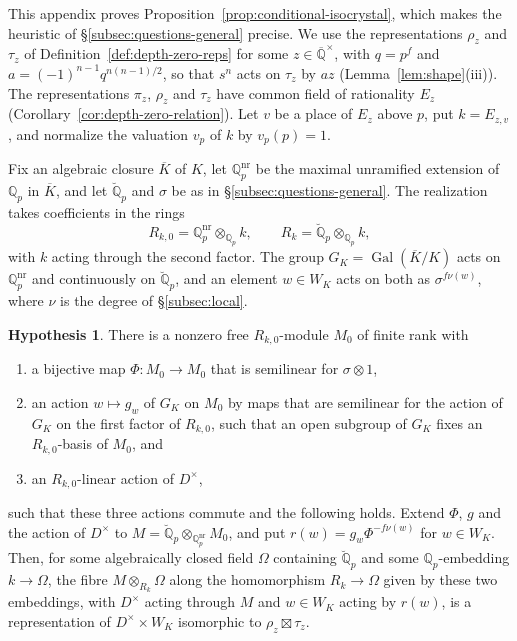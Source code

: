 \documentclass[a4paper,11pt]{amsart}
\theoremstyle{definition}
\newtheorem{hypothesis}[theorem]{Hypothesis}
\theoremstyle{remark}
\numberwithin{equation}{section}
\newcommand{\Q}{\mathbb{Q}}
\DeclareMathOperator{\Gal}{Gal}
\newcommand{\Qb}{\breve{\mathbb{Q}}_p}
\newcommand{\Qbar}{\overline{\mathbb{Q}}}
\begin{document}
This appendix proves Proposition~\ref{prop:conditional-isocrystal}, which makes the heuristic of \S\ref{subsec:questions-general} precise. We use the representations $\rho_z$ and $\tau_z$ of Definition~\ref{def:depth-zero-reps} for some $z\in\Qbar^\times$, with $q=p^f$ and $a=(-1)^{n-1}q^{n(n-1)/2}$, so that $s^n$ acts on $\tau_z$ by $az$ (Lemma~\ref{lem:shape}(iii)). The representations $\pi_z$, $\rho_z$ and $\tau_z$ have common field of rationality $E_z$ (Corollary~\ref{cor:depth-zero-relation}). Let $v$ be a place of $E_z$ above $p$, put $k=E_{z,v}$, and normalize the valuation $v_p$ of $k$ by $v_p(p)=1$.

Fix an algebraic closure $\overline K$ of $K$, let $\Q_p^{\mathrm{nr}}$ be the maximal unramified extension of $\Q_p$ in $\overline K$, and let $\Qb$ and $\sigma$ be as in \S\ref{subsec:questions-general}. The realization takes coefficients in the rings
\[
 R_{k,0}=\Q_p^{\mathrm{nr}}\otimes_{\Q_p}k,\qquad R_k=\Qb\otimes_{\Q_p}k,
\]
with $k$ acting through the second factor. The group $G_K=\Gal(\overline K/K)$ acts on $\Q_p^{\mathrm{nr}}$ and continuously on $\Qb$, and an element $w\in W_K$ acts on both as $\sigma^{f\nu(w)}$, where $\nu$ is the degree of \S\ref{subsec:local}.

\begin{hypothesis}\label{hyp:isocrystal}
There is a nonzero free $R_{k,0}$-module $M_0$ of finite rank with
\begin{enumerate}
\item[(a)] a bijective map $\Phi\colon M_0\to M_0$ that is semilinear for $\sigma\otimes1$,
\item[(b)] an action $w\mapsto g_w$ of $G_K$ on $M_0$ by maps that are semilinear for the action of $G_K$ on the first factor of $R_{k,0}$, such that an open subgroup of $G_K$ fixes an $R_{k,0}$-basis of $M_0$, and
\item[(c)] an $R_{k,0}$-linear action of $D^\times$,
\end{enumerate}
such that these three actions commute and the following holds. Extend $\Phi$, $g$ and the action of $D^\times$ to $M=\Qb\otimes_{\Q_p^{\mathrm{nr}}}M_0$, and put $r(w)=g_w\Phi^{-f\nu(w)}$ for $w\in W_K$. Then, for some algebraically closed field $\Omega$ containing $\Qb$ and some $\Q_p$-embedding $k\to\Omega$, the fibre $M\otimes_{R_k}\Omega$ along the homomorphism $R_k\to\Omega$ given by these two embeddings, with $D^\times$ acting through $M$ and $w\in W_K$ acting by $r(w)$, is a representation of $D^\times\times W_K$ isomorphic to $\rho_z\boxtimes\tau_z$.
\end{hypothesis}
\end{document}
